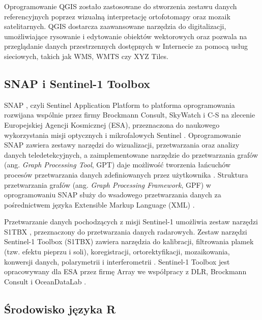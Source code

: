 \documentclass{amuthesis}
\begin{document}
Oprogramowanie QGIS zostało zastosowane do stworzenia zestawu danych
referencyjnych poprzez wizualną interpretację ortofotomapy oraz mozaik
satelitarnych. QGIS dostarcza zaawansowane narzędzia do digitalizacji,
umożliwiające rysowanie i edytowanie obiektów wektorowych oraz pozwala
na przeglądanie danych przestrzennych dostępnych w Internecie za pomocą
usług sieciowych, takich jak WMS, WMTS czy XYZ Tiles.

\hypertarget{snap-i-sentinel-1-toolbox}{%
\subsection{SNAP i Sentinel-1 Toolbox}\label{snap-i-sentinel-1-toolbox}}

SNAP \autocite{snap}, czyli Sentinel Application Platform to platforma
oprogramowania rozwijana wspólnie przez firmy Brockmann Consult,
SkyWatch i C-S na zlecenie Europejskiej Agencji Kosmicznej (ESA),
przeznaczona do naukowego wykorzystania misji optycznych i mikrofalowych
Sentinel \autocite{snap-desktop,esa_snap}. Oprogramowanie SNAP zawiera
zestawy narzędzi do wizualizacji, przetwarzania oraz analizy danych
teledetekcyjnych, a zaimplementowane narzędzie do przetwarzania grafów
(ang. \emph{Graph Processing Tool}, GPT) daje możliwość tworzenia
łańcuchów procesów przetwarzania danych zdefiniowanych przez użytkownika
\autocite{hejmanowska_2020_dane,moskolai_2022_s1_workflow}. Struktura
przetwarzania grafów (ang. \emph{Graph Processing Framework}, GPF) w
oprogramowaniu SNAP służy do wsadowego przetwarzania danych za
pośrednictwem języka Extensible Markup Language (XML)
\autocite{moskolai_2022_s1_workflow}.

Przetwarzanie danych pochodzących z misji Sentinel-1 umożliwia zestaw
narzędzi S1TBX \autocite{s1tbx}, przeznaczony do przetwarzania danych
radarowych. Zestaw narzędzi Sentinel-1 Toolbox (S1TBX) zawiera narzędzia
do kalibracji, filtrowania plamek (tzw. efektu pieprzu i soli),
koregistracji, ortorektyfikacji, mozaikowania, konwersji danych,
polarymetrii i interferometrii \autocite{sentinel-1-toolbox}. Sentinel-1
Toolbox jest opracowywany dla ESA przez firmę Array we współpracy z DLR,
Brockmann Consult i OceanDataLab \autocite{sentinel-1-toolbox}.

\hypertarget{ux15brodowisko-jux119zyka-r}{%
\subsection{Środowisko języka R}\label{ux15brodowisko-jux119zyka-r}}
\end{document}
